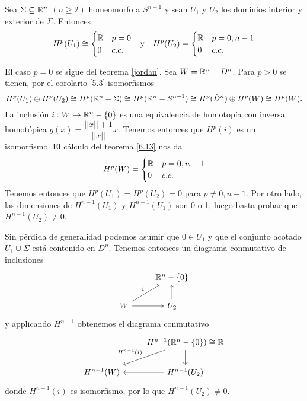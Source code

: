 \documentclass[CV.tex]{subfiles}
\begin{document}
\begin{prop}\label{7.16}
Sea $\Sigma\subseteq\mathbb{R}^n$ $(n\geq 2)$ homeomorfo a $S^{n-1}$ y sean $U_1$ y $U_2$ los dominios interior y exterior de $\Sigma$. Entonces
\begin{align*}
&H^p(U_1)\cong \begin{cases}
\mathbb{R} & p=0\\
0 & c.c.
\end{cases} &\text{y}& & H^p(U_2)=\begin{cases}
\mathbb{R} & p=0,n-1\\
0 & c.c.
\end{cases}
\end{align*}
\end{prop}
\begin{dem}
El caso $p=0$ se sigue del teorema \ref{jordan}. Sea $W=\mathbb{R}^n-D^n$. Para $p>0$ se tienen, por el corolario \ref{5.3} isomorfismos
\[
H^p(U_1)\oplus H^p(U_2)\cong H^p(\mathbb{R}^n-\Sigma)\cong H^p(\mathbb{R}^n-S^{n-1})\cong H^p(\mathring{D}^n)\oplus H^p(W)\cong H^p(W).
\]
La inclusión $i:W\to\mathbb{R}^n-\{0\}$ es una equivalencia de homotopía con inversa homotópica $g(x)=\dfrac{||x||+1}{||x||}x$. Tenemos entonces que $H^p(i)$ es un isomorfismo. El cálculo del teorema \ref{6.13} nos da
\[
H^p(W)=\begin{cases}
\mathbb{R} & p=0,n-1\\
0 & c.c.
\end{cases}
\]
Tenemos entonces que $H^p(U_1)=H^p(U_2)=0$ para $p\neq 0, n-1$. Por otro lado, las dimensiones de $H^{n-1}(U_1)$ y $H^{n-1}(U_1)$ son 0 o 1, luego basta probar que $H^{n-1}(U_2)\neq 0$. 

Sin pérdida de generalidad podemos asumir que $0\in U_1$ y que el conjunto acotado $U_1\cup\Sigma$ está contenido en $D^n$. Tenemos entonces un diagrama conmutativo de inclusiones
\[
\begin{tikzcd}
& \R^n-\{0\}\\
W\arrow[ur, "i"]\arrow[r] & U_2\arrow[u]
\end{tikzcd}
\]
y applicando $H^{n-1}$ obtenemos el diagrama conmutativo
\[
\begin{tikzcd}
& H^{n-1}(\R^n-\{0\})\cong\R\arrow[dl, "H^{n-1}(i)"']\arrow[d]\\
H^{n-1}(W)& H^{n-1}(U_2)\arrow[l] 
\end{tikzcd}
\]
donde $H^{n-1}(i)$ es isomorfismo, por lo que $H^{n-1}(U_2)\neq 0$.
\QED
\end{dem}
\end{document}
